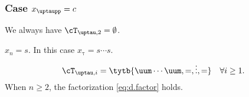 \documentclass[ssunip]{subfiles}
\begin{document}
{\begin{enumT}
  \end{enumT}


  \subsubsection{Case $x_{\uptaupp}=c$}\label{sec:z.c}
  We always have $\cT_{\uptau,2}=\emptyset$.
  \begin{enumT}
    \item  $x_{n} =  s$. In this case $x_{\uptau}=s\cdots s$.
    \begin{equation}\label{eq:ss.c}
      \cT_{\uptau,i} = \tytb{\uum\cdots\uum,=,\vdots,=} \quad \forall i\geq 1.
    \end{equation}
    When $n\geq 2$, the  factorization \eqref{eq:d.factor} holds.


\end{enumT}}
\end{document}
